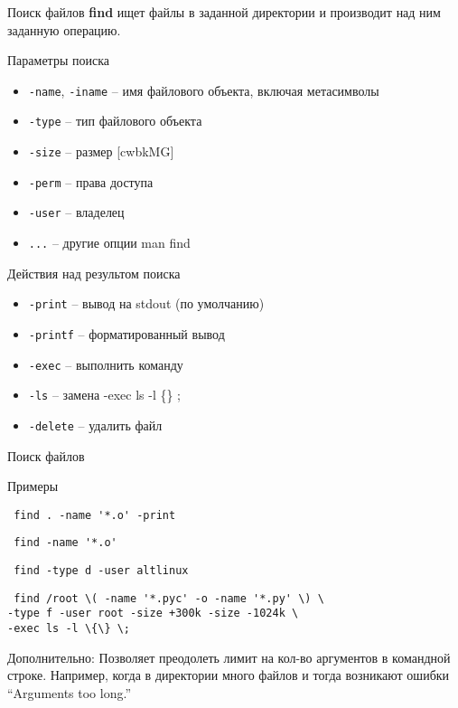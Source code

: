 \begin{frame}[fragile]{Поиск файлов}
    \textbf{find} ищет файлы в заданной директории и производит над ним заданную операцию.
	\begin{block}{Параметры поиска}
		\begin{itemize}
			\item {\tt -name}, {\tt -iname} -- имя файлового объекта, включая метасимволы 
			\item {\tt -type} -- тип файлового объекта
			\item {\tt -size} -- размер [cwbkMG]
			\item {\tt -perm} -- права доступа
			\item {\tt -user} -- владелец
			\item {\tt ...} -- другие опции man find 
		\end{itemize}
	\end{block}
	\begin{block}{Действия над результом поиска}
		\begin{itemize}
			\item {\tt -print} -- вывод на stdout (по умолчанию)
			\item {\tt -printf} -- форматированный вывод
			\item {\tt -exec} -- выполнить команду
			\item {\tt -ls} -- замена -exec ls -l \{\} ;
			\item {\tt -delete} -- удалить файл
		\end{itemize}
	\end{block}
\end{frame}

\begin{frame}[fragile]{Поиск файлов}
	\begin{block}{Примеры}
            \begin{verbatim} find . -name '*.o' -print \end{verbatim}
            \begin{verbatim} find -name '*.o' \end{verbatim}
            \begin{verbatim} find -type d -user altlinux \end{verbatim}
            \begin{verbatim} find /root \( -name '*.pyc' -o -name '*.py' \) \
-type f -user root -size +300k -size -1024k \
-exec ls -l \{\} \; \end{verbatim}
	\end{block}
 Дополнительно:
 Позволяет преодолеть лимит на кол-во аргументов в командной строке. 
 Например, когда в директории много файлов и тогда возникают ошибки
 \textquotedblleft Arguments too long.\textquotedblright 
\end{frame}

